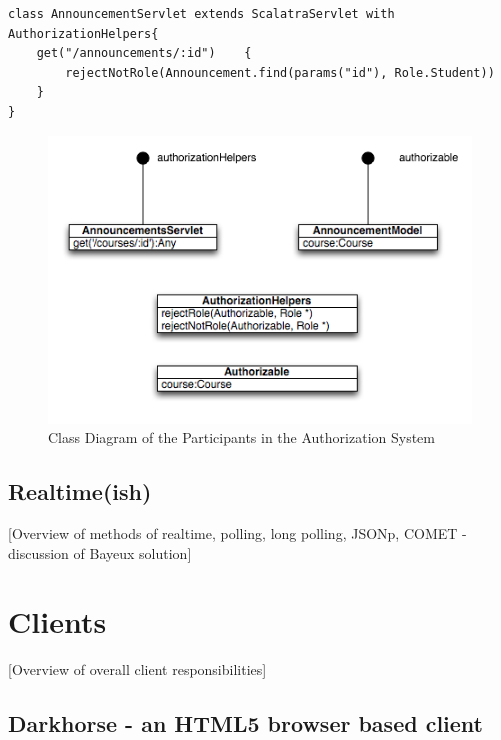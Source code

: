\documentclass[a4paper,12pt,titlepage]{report}
\begin{document}
\begin{lstlisting}[caption=Simple Scalatra Authorization Helpers, label=list:auth_helpers]
class AnnouncementServlet extends ScalatraServlet with AuthorizationHelpers{
	get("/announcements/:id")	 {
		rejectNotRole(Announcement.find(params("id"), Role.Student))
	}
}
\end{lstlisting}

\begin{figure}
\includegraphics[width=\textwidth]{auth_uml}
\caption{Class Diagram of the Participants in the Authorization System}
\label{fig:auth_uml}
\end{figure}



\subsection{Realtime(ish)} %
\label{sub:realtime}

[Overview of methods of realtime, polling, long polling, JSONp, COMET - discussion of Bayeux solution]



\section{Clients} %
\label{sec:clients}

[Overview of overall client responsibilities]

\subsection{Darkhorse - an HTML5 browser based client} %
\label{sub:darkhorse}
\end{document}
